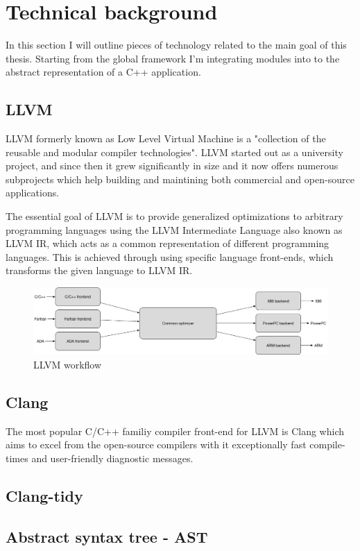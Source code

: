 \section{Technical background}
\par In this section I will outline pieces of technology related to the main goal of this thesis. Starting from the global framework I'm integrating modules into to the abstract representation of a C++ application.


\subsection{LLVM}
\par LLVM formerly known as Low Level Virtual Machine is a "collection of the reusable and modular compiler technologies"\cite{llvm_mainpage}. LLVM started out as a university project\cite{LLVM:CGO04}, and since then it grew significantly in size and it now offers numerous subprojects which help building and maintining both commercial and open-source applications.
\par The essential goal of LLVM is to provide generalized optimizations to arbitrary programming languages using the LLVM Intermediate Language also known as LLVM IR, which acts as a common representation of different programming languages. This is achieved through using specific language front-ends, which transforms the given language to LLVM IR. 
\begin{figure}[h]
	\caption{LLVM workflow}
	\includegraphics[scale=0.33]{images/llvm_flow}
\end{figure}

\subsection{Clang}
\par The most popular C/C++ familiy compiler front-end for LLVM is Clang which aims to excel from the open-source compilers with it exceptionally fast compile-times and user-friendly diagnostic messages. 
\subsection{Clang-tidy}
\subsection{Abstract syntax tree - AST}